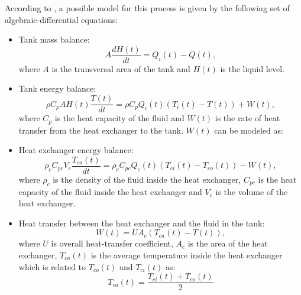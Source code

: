 According to \citet{Alfaro2016}, a possible model for this process is given by the following set of algebraic-differential equations:
\begin{itemize}
	\item Tank mass balance:
			\begin{equation*}
				A \frac{d H(t)}{dt} = Q_i(t) - Q(t),
			\end{equation*}
			where $A$ is the transversal area of the tank and $H(t)$ is the liquid level.
	\item Tank energy balance:
			\begin{equation*}
				\rho C_p A H(t) \frac{T(t)}{dt} = \rho C_p Q_i(t)\left( T_i(t) - T(t)\right) + W(t),
			\end{equation*}
			where $C_p$ is the heat capacity of the fluid and $W(t)$ is the rate of heat transfer from the heat exchanger to the tank. $W(t)$ can be modeled as:
	\item Heat exchanger energy balance:
			\begin{equation*}
				\rho_c C_{pc} V_c \frac{T_{ca}(t)}{dt} = \rho_c C_{pc} Q_c(t)\left( T_{ci}(t)-T_{co}(t)\right) - W(t),
			\end{equation*}
			where $\rho_c$ is the density of the fluid inside the heat exchanger, $C_{pc}$ is the heat capacity of the fluid inside the heat exchanger and $V_c$ is the volume of the heat exchanger.
	\item Heat transfer between the heat exchanger and the fluid in the tank:
			\begin{equation*}
				W(t) = U A_c \left( T_{ca}(t) - T(t)\right), 
			\end{equation*}
			where $U$ is overall heat-transfer coefficient, $A_c$ is the area of the heat exchanger, $T_{ca}(t)$ is the average temperature inside the heat exchanger which is related to $T_{co}(t)$ and $T_{ci}(t)$ as:
			\begin{equation*}
				T_{ca}(t) = \frac{T_{ci}(t) + T_{co}(t)}{2}
			\end{equation*}
\end{itemize}

